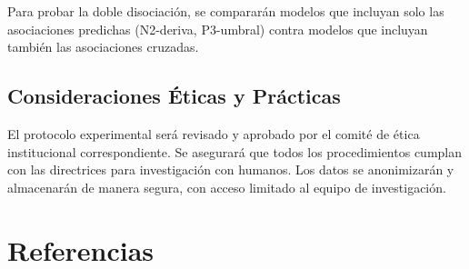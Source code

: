 \documentclass[
  spanish,
  10pt,
]{article}
\begin{document}
Para probar la doble disociación, se compararán modelos que incluyan
solo las asociaciones predichas (N2-deriva, P3-umbral) contra modelos
que incluyan también las asociaciones cruzadas.

\subsection{Consideraciones Éticas y
Prácticas}\label{consideraciones-uxe9ticas-y-pruxe1cticas}

El protocolo experimental será revisado y aprobado por el comité de
ética institucional correspondiente. Se asegurará que todos los
procedimientos cumplan con las directrices para investigación con
humanos. Los datos se anonimizarán y almacenarán de manera segura, con
acceso limitado al equipo de investigación.

\section*{Referencias}\label{bibliography}
\end{document}
